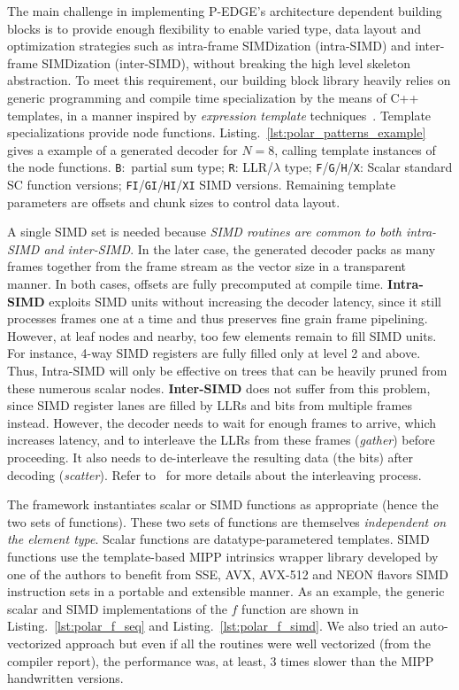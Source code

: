The main challenge in implementing P-EDGE's architecture dependent building
blocks is to provide enough flexibility to enable varied type, data layout and
optimization strategies such as intra-frame SIMDization (intra-SIMD) and
inter-frame SIMDization (inter-SIMD), without breaking the high level skeleton
abstraction. To meet this requirement, our building block library heavily relies
on generic programming and compile time specialization by the means of C++
templates, in a manner inspired by \emph{expression template}
techniques~\cite{Stroustrup2013}. Template specializations provide node
functions. Listing.~\ref{lst:polar_patterns_example} gives a example of a
generated decoder for $N = 8$, calling template instances of the node functions.
\texttt{B}:~partial sum type; \texttt{R}: LLR/$\lambda$ type;
\texttt{F}/\texttt{G}/\texttt{H}/\texttt{X}: Scalar standard SC function
versions; \texttt{FI}/\texttt{GI}/\texttt{HI}/\texttt{XI} SIMD versions.
Remaining template parameters are offsets and chunk sizes to control data
layout.

A single SIMD set is needed because \emph{SIMD routines are common to both
intra-SIMD and inter-SIMD}. In the later case, the generated decoder packs as
many frames together from the frame stream as the vector size in a transparent
manner. In both cases, offsets are fully precomputed at compile time.
\textbf{Intra-SIMD} exploits SIMD units without increasing the decoder latency,
since it still processes frames one at a time and thus preserves fine grain
frame pipelining. However, at leaf nodes and nearby, too few elements remain to
fill SIMD units. For instance, 4-way SIMD registers are fully filled only at
level 2 and above. Thus, Intra-SIMD will only be effective on trees that can be
heavily pruned from these numerous scalar nodes. \textbf{Inter-SIMD} does not
suffer from this problem, since SIMD register lanes are filled by LLRs and bits
from multiple frames instead. However, the decoder needs to wait for enough
frames to arrive, which increases latency, and to interleave the LLRs from these
frames (\emph{gather}) before proceeding. It also needs to de-interleave the
resulting data (the bits) after decoding (\emph{scatter}). Refer
to~\cite{LeGal2015a} for more details about the interleaving process.

The framework instantiates scalar or SIMD functions as appropriate (hence the
two sets of functions). These two sets of functions are themselves
\emph{independent on the element type}. Scalar functions are
datatype-parametered templates. SIMD functions use the template-based MIPP
intrinsics wrapper library developed by one of the authors to benefit from SSE,
AVX, AVX-512 and NEON flavors SIMD instruction sets in a portable and extensible
manner. As an example, the generic scalar and SIMD implementations of the $f$
function are shown in Listing.~\ref{lst:polar_f_seq} and
Listing.~\ref{lst:polar_f_simd}. We also tried an auto-vectorized approach but even
if all the routines were well vectorized (from the compiler report), the
performance was, at least, 3 times slower than the MIPP handwritten versions.

